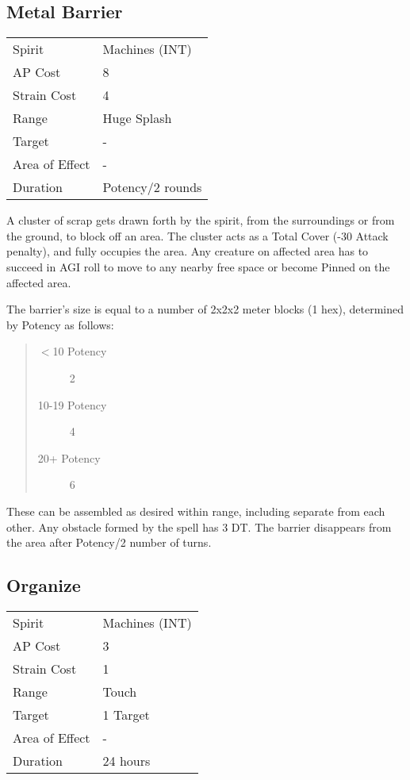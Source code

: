 \documentclass[11pt,a4paper,twocolumn]{book}
\begin{document}
\subsection*{Metal Barrier}
{
	\begin{tabu} to 70mm{| X[l,4] | X[l,7] |}
		\hline
		Spirit         & Machines (INT)   \\
		AP Cost        & 8                \\
		Strain Cost    & 4                \\
		Range          & Huge Splash      \\
		Target         & -                \\
		Area of Effect & -                \\
		Duration       & Potency/2 rounds \\ \hline
	\end{tabu}
	
}

\medskip

A cluster of scrap gets drawn forth by the spirit, from the surroundings or from the ground, to block off an area. The cluster acts as a Total Cover (-30 Attack penalty), and fully occupies the area. Any creature on affected area has to succeed in AGI roll to move to any nearby free space or become Pinned on the affected area. 

The barrier's size is equal to a number of 2x2x2 meter blocks (1 hex), determined by Potency as follows: 
\begin{quote}
	\begin{description}
		\item[$<$10 Potency] 	2
		\item[10-19 Potency] 	4
		\item[20+ Potency]  	6
	\end{description}	
\end{quote}

These can be assembled as desired within range, including separate from each other. Any obstacle formed by the spell has 3 DT. The barrier disappears from the area after Potency/2 number of turns.

\subsection*{Organize}
{
	\begin{tabu} to 70mm{| X[l,4] | X[l,7] |}
		\hline
		Spirit         & Machines (INT)  \\
		AP Cost        & 3               \\
		Strain Cost    & 1               \\
		Range          & Touch               \\
		Target         & 1 Target           \\
		Area of Effect & -               \\
		Duration       & 24 hours \\ \hline
	\end{tabu}
	
}
\end{document}
